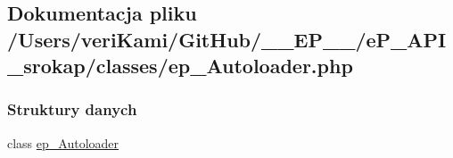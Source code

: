 \hypertarget{ep___autoloader_8php}{\subsection{Dokumentacja pliku /\-Users/veri\-Kami/\-Git\-Hub/\-\_\-\-\_\-\-E\-P\-\_\-\-\_\-/e\-P\-\_\-\-A\-P\-I\-\_\-srokap/classes/ep\-\_\-\-Autoloader.php}
\label{ep___autoloader_8php}
}
\subsubsection*{Struktury danych}
\begin{DoxyCompactItemize}
\item 
class \hyperlink{classep___autoloader}{ep\-\_\-\-Autoloader}
\end{DoxyCompactItemize}
